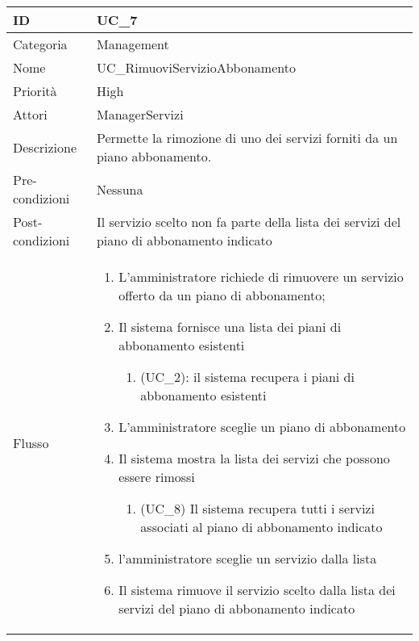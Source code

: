 \begin{center}
\begin{tabular}{ |p{2cm}|p{13cm}|  }
\hline
ID & UC\_7 \\\hline
Categoria & Management\\\hline
Nome & UC\_RimuoviServizioAbbonamento\\\hline
Priorità & High \\\hline
Attori &  ManagerServizi \\\hline
Descrizione & Permette la rimozione di uno dei servizi forniti da un piano abbonamento.\\\hline
Pre-condizioni &  Nessuna \\\hline
Post-condizioni &  Il servizio scelto non fa parte della lista dei servizi del piano di abbonamento indicato\\\hline
Flusso &  	\begin{enumerate}
		\item L'amministratore richiede di rimuovere un servizio offerto da un piano di abbonamento;
		\item Il sistema fornisce una lista dei piani di abbonamento esistenti
		\begin{enumerate}[  ]
			\item (UC\_2): il sistema recupera i piani di abbonamento esistenti
		\end{enumerate}
		\item L'amministratore sceglie un piano di abbonamento
		\item Il sistema mostra la lista dei servizi che possono essere rimossi		
			\begin{enumerate}[label*=\arabic*.]
			\item (UC\_8) Il sistema recupera tutti i servizi associati al piano di abbonamento indicato
			\end{enumerate}
		\item l'amministratore sceglie un servizio dalla lista
		\item Il sistema rimuove il servizio scelto dalla lista dei servizi del piano di abbonamento indicato
		\end{enumerate}\\\hline
\end{tabular}
\label{table_use_case:7}\newline



\end{center}
